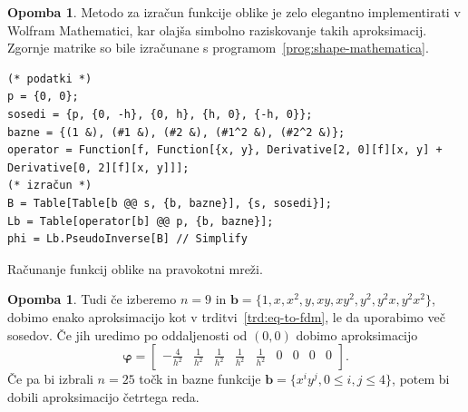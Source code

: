 \documentclass[12pt,a4paper,twoside]{article}
\theoremstyle{definition} %
\newtheorem{opomba}[definicija]{Opomba}
\theoremstyle{plain} %
\numberwithin{equation}{section}
\renewcommand{\b}{\boldsymbol}
\renewcommand{\phi}{\varphi}
\begin{document}
\begin{opomba}
  Metodo za izračun funkcije oblike je zelo elegantno implementirati v
  Wolfram Mathematici, kar olajša simbolno raziskovanje takih aproksimacij.
  Zgornje matrike so bile izračunane s programom~\ref{prog:shape-mathematica}.

  \begin{listing}[!h]
    \vspace{-1ex}
  \begin{verbatim}
(* podatki *)
p = {0, 0};
sosedi = {p, {0, -h}, {0, h}, {h, 0}, {-h, 0}};
bazne = {(1 &), (#1 &), (#2 &), (#1^2 &), (#2^2 &)};
operator = Function[f, Function[{x, y}, Derivative[2, 0][f][x, y] + Derivative[0, 2][f][x, y]]];
(* izračun *)
B = Table[Table[b @@ s, {b, bazne}], {s, sosedi}];
Lb = Table[operator[b] @@ p, {b, bazne}];
phi = Lb.PseudoInverse[B] // Simplify
  \end{verbatim}
  \vspace{-3ex}
  \caption{Računanje funkcij oblike na pravokotni mreži.}
  \label{prog:shape-mathematica}
  \end{listing}
\end{opomba}
\begin{opomba}
  \label{op:fdm-9}
  Tudi če izberemo $n=9$ in $\b b = \{1, x, x^2, y, xy, xy^2, y^2, y^2 x, y^2
  x^2 \}$, dobimo enako aproksimacijo kot v trditvi~\ref{trd:eq-to-fdm}, le da
  uporabimo več sosedov. Če jih uredimo po oddaljenosti od $(0, 0)$ dobimo
  aproksimacijo
  \begin{equation}
    \b\phi =  \begin{bmatrix}
    -\frac{4}{h^2} & \frac{1}{h^2} & \frac{1}{h^2} & \frac{1}{h^2} &
    \frac{1}{h^2} & 0 & 0 & 0 & 0
  \end{bmatrix}.
    \label{eq:shape-mon9}
  \end{equation}
 Če pa bi izbrali $n=25$ točk in bazne funkcije $\b b = \{x^iy^j, 0 \leq i, j
 \leq 4 \}$, potem bi dobili aproksimacijo četrtega reda.
\end{opomba}
\end{document}
